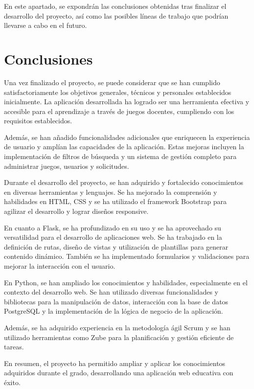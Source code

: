 
En este apartado, se expondrán las conclusiones obtenidas tras finalizar el desarrollo del proyecto, así como las posibles líneas de trabajo que podrían llevarse a cabo en el futuro.

\section{Conclusiones}
Una vez finalizado el proyecto, se puede considerar que se han cumplido satisfactoriamente los objetivos generales, técnicos y personales establecidos inicialmente. La aplicación desarrollada ha logrado ser una herramienta efectiva y accesible para el aprendizaje a través de juegos docentes, cumpliendo con los requisitos establecidos.

Además, se han añadido funcionalidades adicionales que enriquecen la experiencia de usuario y amplían las capacidades de la aplicación. Estas mejoras incluyen la implementación de filtros de búsqueda y un sistema de gestión completo para administrar juegos, usuarios y solicitudes.

Durante el desarrollo del proyecto, se han adquirido y fortalecido conocimientos en diversas herramientas y lenguajes. Se ha mejorado la comprensión y habilidades en HTML, CSS y se ha utilizado el framework Bootstrap para agilizar el desarrollo y lograr diseños responsive.

En cuanto a Flask, se ha profundizado en su uso y se ha aprovechado su versatilidad para el desarrollo de aplicaciones web. Se ha trabajado en la definición de rutas, diseño de vistas y utilización de plantillas para generar contenido dinámico. También se ha implementado formularios y validaciones para mejorar la interacción con el usuario.

En Python, se han ampliado los conocimientos y habilidades, especialmente en el contexto del desarrollo web. Se han utilizado diversas funcionalidades y bibliotecas para la manipulación de datos, interacción con la base de datos PostgreSQL y la implementación de la lógica de negocio de la aplicación.

Además, se ha adquirido experiencia en la metodología ágil Scrum y se han utilizado herramientas como Zube para la planificación y gestión eficiente de tareas. 

En resumen, el proyecto ha permitido ampliar y aplicar los conocimientos adquiridos durante el grado, desarrollando una aplicación web educativa con éxito.

